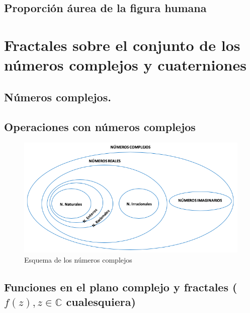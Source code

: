 \documentclass[
  11pt,
]{krantz}
\theoremstyle{definition}
\theoremstyle{definition}
\theoremstyle{definition}
\theoremstyle{definition}
\theoremstyle{remark}
\begin{document}
\hypertarget{proporciuxf3n-uxe1urea-de-la-figura-humana}{%
\section{Proporción áurea de la figura humana}\label{proporciuxf3n-uxe1urea-de-la-figura-humana}}

\hypertarget{fractales-sobre-el-conjunto-de-los-nuxfameros-complejos-y-cuaterniones}{%
\chapter{Fractales sobre el conjunto de los números complejos y cuaterniones}\label{fractales-sobre-el-conjunto-de-los-nuxfameros-complejos-y-cuaterniones}}

\hypertarget{nuxfameros-complejos.}{%
\section{Números complejos.}\label{nuxfameros-complejos.}}

\hypertarget{operaciones-con-nuxfameros-complejos}{%
\section{Operaciones con números complejos}\label{operaciones-con-nuxfameros-complejos}}

\begin{figure}

{\centering \includegraphics[width=1\linewidth,height=1\textheight]{complex} 

}

\caption{Esquema de los números complejos}\label{fig:complex}
\end{figure}

\hypertarget{funciones-en-el-plano-complejo-y-fractales-fz-zinmathbbc-cualesquiera}{%
\section{\texorpdfstring{Funciones en el plano complejo y fractales (\(f(z), z\in\mathbb{C}\) cualesquiera)}{Funciones en el plano complejo y fractales (f(z), z\textbackslash in\textbackslash mathbb\{C\} cualesquiera)}}\label{funciones-en-el-plano-complejo-y-fractales-fz-zinmathbbc-cualesquiera}}
\end{document}
